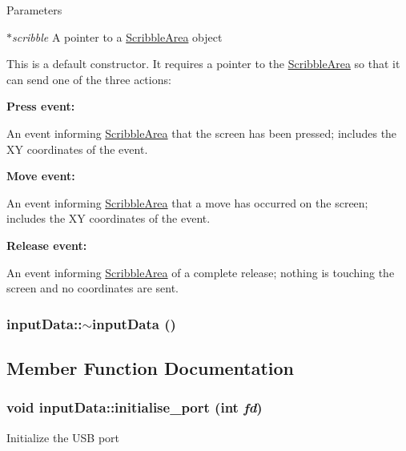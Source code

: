 \begin{DoxyParams}{Parameters}
\item[{\em $\ast$scribble}]A pointer to a \hyperlink{classScribbleArea}{ScribbleArea} object\end{DoxyParams}
This is a default constructor. It requires a pointer to the \hyperlink{classScribbleArea}{ScribbleArea} so that it can send one of the three actions:
\begin{DoxyItemize}
\item {\bfseries Press event:} \par
An event informing \hyperlink{classScribbleArea}{ScribbleArea} that the screen has been pressed; includes the XY coordinates of the event.
\begin{DoxyPre}\end{DoxyPre}

\item {\bfseries Move event:} \par
An event informing \hyperlink{classScribbleArea}{ScribbleArea} that a move has occurred on the screen; includes the XY coordinates of the event.
\begin{DoxyPre}\end{DoxyPre}

\item {\bfseries Release event:} \par
An event informing \hyperlink{classScribbleArea}{ScribbleArea} of a complete release; nothing is touching the screen and no coordinates are sent.
\begin{DoxyPre}\end{DoxyPre}
 
\end{DoxyItemize}\hypertarget{classinputData_a274ac89032afd6577250e13efad58e8a}{
\subsubsection[{$\sim$inputData}]{\setlength{\rightskip}{0pt plus 5cm}inputData::$\sim$inputData ()}}
\label{classinputData_a274ac89032afd6577250e13efad58e8a}


\subsection{Member Function Documentation}
\hypertarget{classinputData_a34d2155db86b23204da21a3af5ef1211}{
\subsubsection[{initialise\_\-port}]{\setlength{\rightskip}{0pt plus 5cm}void inputData::initialise\_\-port (int {\em fd})}}
\label{classinputData_a34d2155db86b23204da21a3af5ef1211}
Initialize the USB port


